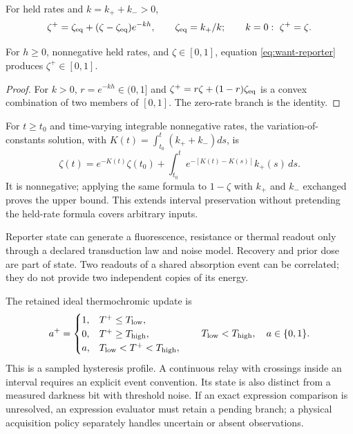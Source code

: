 For held rates and $k=k_++k_->0$,
\begin{equation}
 \zeta^+=\zeta_{\rm eq}+(\zeta-\zeta_{\rm eq})e^{-kh},\qquad
 \zeta_{\rm eq}=k_+/k;\qquad
 k=0:\ \zeta^+=\zeta .
 \label{eq:want-reporter}
\end{equation}
\begin{proposition}
For $h\ge0$, nonnegative held rates, and $\zeta\in[0,1]$,
equation \eqref{eq:want-reporter} produces $\zeta^+\in[0,1]$.
\end{proposition}
\begin{proof}
For $k>0$, $r=e^{-kh}\in(0,1]$ and
$\zeta^+=r\zeta+(1-r)\zeta_{\rm eq}$ is a convex combination of two
members of $[0,1]$. The zero-rate branch is the identity.
\end{proof}
For $t\ge t_0$ and time-varying integrable nonnegative rates, the variation-of-constants
solution, with $K(t)=\int_{t_0}^t(k_++k_-)ds$, is
\begin{equation}
 \zeta(t)=e^{-K(t)}\zeta(t_0)
           +\int_{t_0}^t e^{-[K(t)-K(s)]}k_+(s)\,ds .
\end{equation}
It is nonnegative; applying the same formula to $1-\zeta$ with $k_+$ and
$k_-$ exchanged proves the upper bound. This extends interval preservation
without pretending the held-rate formula covers arbitrary inputs.

Reporter state can generate a fluorescence, resistance or thermal readout
only through a declared transduction law and noise model. Recovery and prior
dose are part of state. Two readouts of a shared absorption event can be
correlated; they do not provide two independent copies of its energy.

The retained ideal thermochromic update is
\begin{equation}
 a^+=\begin{cases}
 1,&T^+\le T_{\rm low},\\
 0,&T^+\ge T_{\rm high},\\
 a,&T_{\rm low}<T^+<T_{\rm high},
 \end{cases}\qquad T_{\rm low}<T_{\rm high},\quad a\in\{0,1\} .
\end{equation}
This is a sampled hysteresis profile. A continuous relay with crossings
inside an interval requires an explicit event convention. Its state is also
distinct from a measured darkness bit with threshold noise. If an exact
expression comparison is unresolved, an expression evaluator must retain a
pending branch; a physical acquisition policy separately handles uncertain
or absent observations.

